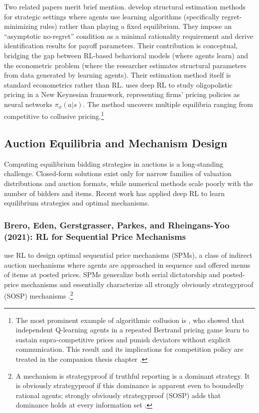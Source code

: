 Two related papers merit brief mention. \citet{LomysMagnolfi2024} develop structural estimation methods for strategic settings where agents use learning algorithms (specifically regret-minimizing rules) rather than playing a fixed equilibrium. They impose an ``asymptotic no-regret'' condition as a minimal rationality requirement and derive identification results for payoff parameters. Their contribution is conceptual, bridging the gap between RL-based behavioral models (where agents learn) and the econometric problem (where the researcher estimates structural parameters from data generated by learning agents). Their estimation method itself is standard econometrics rather than RL. \citet{Covarrubias2022} uses deep RL to study oligopolistic pricing in a New Keynesian framework, representing firms' pricing policies as neural networks $\pi_\phi(a|s)$. The method uncovers multiple equilibria ranging from competitive to collusive pricing.\footnote{The most prominent example of algorithmic collusion is \citet{Calvano2020}, who showed that independent Q-learning agents in a repeated Bertrand pricing game learn to sustain supra-competitive prices and punish deviators without explicit communication. This result and its implications for competition policy are treated in the companion thesis chapter \citep{Rawat2026collusion}.}


\subsection{Auction Equilibria and Mechanism Design}

Computing equilibrium bidding strategies in auctions is a long-standing challenge. Closed-form solutions exist only for narrow families of valuation distributions and auction formats, while numerical methods scale poorly with the number of bidders and items. Recent work has applied deep RL to learn equilibrium strategies and optimal mechanisms.


\subsubsection{Brero, Eden, Gerstgrasser, Parkes, and Rheingans-Yoo (2021): RL for Sequential Price Mechanisms}

\citet{BreroEtAl2021} use RL to design optimal sequential price mechanisms (SPMs), a class of indirect auction mechanisms where agents are approached in sequence and offered menus of items at posted prices. SPMs generalize both serial dictatorship and posted-price mechanisms and essentially characterize all strongly obviously strategyproof (SOSP) mechanisms \citep{PyciaAndTroyan2019}.\footnote{A mechanism is strategyproof if truthful reporting is a dominant strategy. It is obviously strategyproof if this dominance is apparent even to boundedly rational agents; strongly obviously strategyproof (SOSP) adds that dominance holds at every information set \citep{PyciaAndTroyan2019}.}

